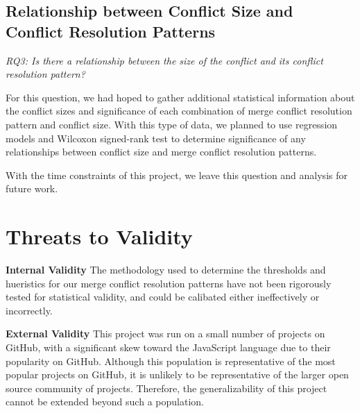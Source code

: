 \documentclass{sig-alternate-05-2015}
\begin{document}
\subsection{Relationship between Conflict Size and Conflict Resolution Patterns}
\textit{RQ3: Is there a relationship between the size of the conflict and its conflict resolution pattern?}

For this question, we had hoped to gather additional statistical information about the conflict sizes and significance of each combination of merge conflict resolution pattern and conflict size. With this type of data, we planned to use regression models and Wilcoxon signed-rank test to determine significance of any relationships between conflict size and merge conflict resolution patterns.

With the time constraints of this project, we leave this question and analysis for future work.

\section{Threats to Validity}
\textbf{Internal Validity}
The methodology used to determine the thresholds and hueristics for our merge conflict resolution patterns have not been rigorously tested for statistical validity, and could be calibated either ineffectively or incorrectly.

\textbf{External Validity}
This project was run on a small number of projects on GitHub, with a significant skew toward the JavaScript language due to their popularity on GitHub. Although this population is representative of the most popular projects on GitHub, it is unlikely to be representative of the larger open source community of projects. Therefore, the generalizability of this project cannot be extended beyond such a population.

{}

\end{document}
